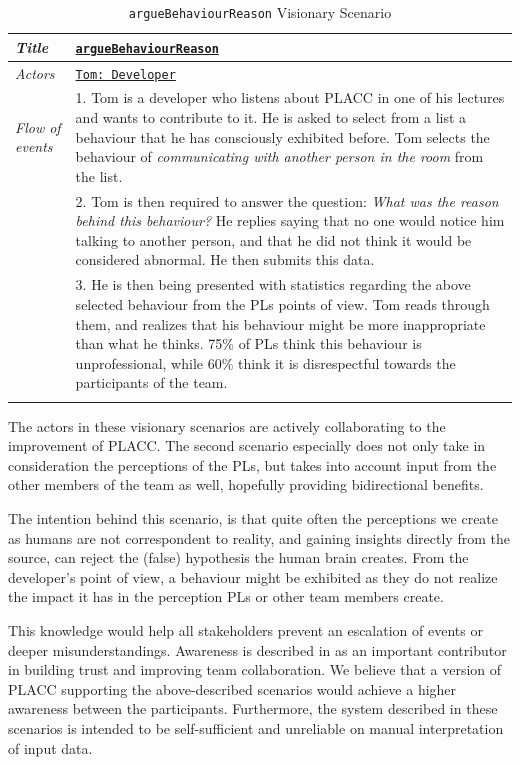 \begin{longtable}[ht]{ p{}  p{} }
\caption{\texttt{argueBehaviourReason} Visionary Scenario}
\label{tab:secondVisionaryScenario}\\
\hline
\textit{Title} & \underline{\texttt{argueBehaviourReason}} \\ [1.2ex]
    \hline
   \textit{Actors} & \underline{\texttt{Tom: Developer}} \\ [1.2ex]
   \hline
   \textit{Flow of events } &  1. Tom is a developer who listens about PLACC in one of his lectures and wants to contribute to it.  He is asked to select from a list a behaviour that he has consciously exhibited before.  Tom selects the behaviour of \textit{communicating with another person in the room} from the list. \\
   & 2.  Tom is then required to answer the question: \textit{What was the reason behind this behaviour?} He replies saying that no one would notice him talking to another person,  and that he did not think it would be considered abnormal.  He then submits this data.\\
   & 3. He is then being presented with statistics regarding the above selected behaviour from the PLs points of view.  Tom reads through them,  and realizes that his behaviour might be more inappropriate than what he thinks.  75\% of PLs think this behaviour is unprofessional, while 60\% think it is disrespectful towards the participants of the team.\\
   \hline
\label{tab:multicol}
\end{longtable}

The actors in these visionary scenarios are actively collaborating to the improvement of PLACC.  The second scenario especially does not only take in consideration the perceptions of the PLs,  but takes into account input from the other members of the team as well, hopefully providing bidirectional benefits.  

The intention behind this scenario,  is that quite often the perceptions we create as humans are not correspondent to reality,  and gaining insights directly from the source, can reject the (false) hypothesis the human brain creates.  From the developer's point of view,  a behaviour might be exhibited as they do not realize the impact it has in the perception PLs or other team members create.  

This knowledge would help all stakeholders prevent an escalation of events or deeper misunderstandings. Awareness is described in \cite{Trainer2018} as an important contributor in building trust and improving team collaboration. We believe that a version of PLACC supporting the above-described scenarios would achieve a higher awareness between the participants.  Furthermore, the system described in these scenarios is intended to be self-sufficient and unreliable on manual interpretation of input data. 

